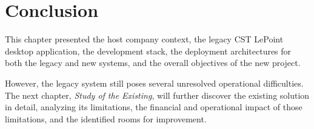 \section{Conclusion}
This chapter presented the host company context, the legacy CST LePoint desktop application, the development stack, the deployment architectures for both the legacy and new systems, and the overall objectives of the new project.

However, the legacy system still poses several unresolved operational difficulties. The next chapter, \emph{Study of the Existing}, will further discover the existing solution in detail, analyzing its limitations, the financial and operational impact of those limitations, and the identified rooms for improvement.

